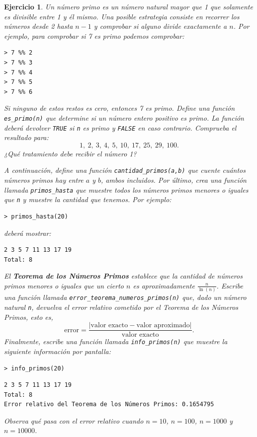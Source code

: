 \documentclass[11pt,a4paper]{article}
\theoremstyle{exercise}
\newtheorem{exercise}{Ejercicio}
\begin{document}
\begin{exercise}  Un número primo es un número natural mayor que 1 que solamente es divisible entre 1 y él mismo. Una posible estrategia consiste en recorrer los números desde 2 hasta $n-1$ y comprobar si alguno divide exactamente a $n$. Por ejemplo, para comprobar si 7 es primo podemos comprobar:
\begin{lstlisting}[style=rconsole]
> 7 %% 2
> 7 %% 3
> 7 %% 4
> 7 %% 5
> 7 %% 6
\end{lstlisting}
Si ninguno de estos restos es cero, entonces 7 es primo. Define una función \texttt{es\_primo(n)} que determine si un número entero positivo es primo. La función deberá devolver \texttt{TRUE} si \texttt{n} es primo y \texttt{FALSE} en caso contrario. Comprueba el resultado para:
\[
1,\ 2,\ 3,\ 4,\ 5,\ 10,\ 17,\ 25,\ 29,\ 100.
\]
¿Qué tratamiento debe recibir el número 1?

\medskip

A continuación, define una función \texttt{cantidad\_primos(a,b)} que cuente cuántos números primos hay entre $a$ y $b$, ambos incluidos. Por último, crea una función llamada \texttt{primos\_hasta} que muestre todos los números primos menores o iguales que \texttt{n} y muestre la cantidad que tenemos. Por ejemplo:
\begin{lstlisting}[style=rconsole]
> primos_hasta(20)
\end{lstlisting}	
deberá mostrar:
\begin{lstlisting}[style=routput]
2 3 5 7 11 13 17 19
Total: 8
\end{lstlisting}
El \textbf{Teorema de los Números Primos} establece que la cantidad de números primos menores o iguales que un cierto $n$ es aproximadamente $\frac{n}{\ln(n)}$. Escribe una función llamada \texttt{error\_teorema\_numeros\_primos(n)} que, dado un número natural \texttt{n}, devuelva el error relativo cometido por el Teorema de los Números Primos, esto es, 
\[ \text{error} = \frac{|\text{valor exacto}-\text{valor aproximado}|}{\text{valor exacto}}. \]
Finalmente, escribe una función llamada \texttt{info\_primos(n)} que muestre la siguiente información por pantalla:
\begin{lstlisting}[style=rconsole]
> info_primos(20)
\end{lstlisting}	
\begin{lstlisting}[style=routput]
2 3 5 7 11 13 17 19
Total: 8
Error relativo del Teorema de los Números Primos: 0.1654795
\end{lstlisting}
Observa qué pasa con el error relativo cuando $n=10$, $n=100$, $n=1000$ y $n=10000$.
\end{exercise}
\end{document}
